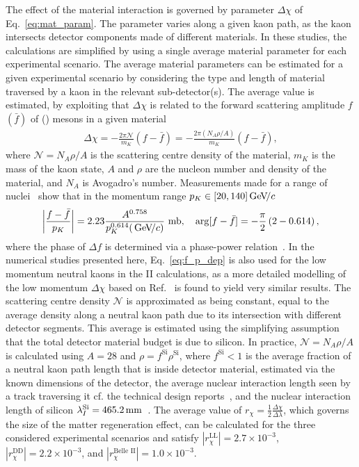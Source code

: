 The effect of the material interaction is governed by parameter $\Delta\chi$ of Eq.~\eqref{eq:mat_param}. The parameter varies along a given kaon path, as the kaon intersects detector components made of different materials. In these studies, the calculations are simplified by using a single average material parameter for each experimental scenario. The average material parameters can be estimated for a given experimental scenario by considering the type and length of material traversed by a kaon in the relevant sub-detector(s). The average value is estimated, by exploiting that $\Delta\chi$ is related to the forward scattering amplitude $f$ $(\bar f)$ of \Kz (\Kzb) mesons in a given material~\cite{goodRelationScatteringAbsorption1957,fetscherRegenerationArbitraryCoherent1996}
\begin{align}\label{eq:mat_delta_chi}
    \Delta \chi = - \frac{2\pi \mathcal{N}}{m_K}(f-\bar f) = - \frac{2\pi (N_A \rho/A)}{m_K}(f-\bar f),
\end{align}
where $\mathcal{N}=N_A\rho/A$ is the scattering centre density of the material, $m_K$ is the mass of the kaon state,  $A$ and $\rho$ are the nucleon number and density of the material, and $N_A$ is Avogadro's number.
Measurements made for a range of nuclei~\cite{Gsponer1979} show that in the momentum range $p_K\in [20, 140]\text{\,Ge\kern -0.1em V\!/}c$
\begin{align} \label{eq:f_p_dep}
    \left|\frac{f-\bar f}{p_K}\right| = 2.23 \frac{A^{0.758}} {p_K^{0.614} (\text{\,Ge\kern -0.1em V\!/}c)} \text{ mb}, \quad \arg [f - \bar f] = -\frac{\pi}{2}\left(2-0.614\right),
\end{align}
where the phase of $\Delta f$ is determined via a phase-power relation~\cite{Briere1995}. In the numerical studies presented here, Eq.~\eqref{eq:f_p_dep} is also used for the low momentum neutral kaons in the \belle II calculations, as a more detailed modelling of the low momentum $\Delta\chi$ based on Ref.~\cite{Ko2011} is found to yield very similar results. The scattering centre density $\mathcal{N}$ is approximated as being constant, equal to the average density along a neutral kaon path due to its intersection with different detector segments. This average is estimated using the simplifying assumption that the total detector material budget is due to silicon. In practice, $\mathcal{N}=N_A\rho/A$ is calculated using $A=28$ and $\rho = f^\text{Si}\rho^\text{Si}$, where $f^\text{Si}<1$ is the average fraction of a neutral kaon path length that is inside detector material, estimated via the known dimensions of the detector, the average nuclear interaction length seen by a track traversing it cf. the technical design reports~\cite{CERN-LHCC-2003-030,RICH-TDR}, and the nuclear interaction length of silicon $\lambda_I^\text{Si}=465.2\text{\,mm}$~\cite{PDG2020}. 
The average value of $r_\chi=\frac{1}{2}\frac{\Delta\chi}{\Delta\lambda}$, which governs the size of the matter regeneration effect, can be calculated for the three considered experimental scenarios and satisfy $|r_\chi^\text{LL}|=2.7\times10^{-3}$, $|r_\chi^\text{DD}|=2.2\times10^{-3}$, and ${|r_\chi^\text{Belle II}|=1.0\times10^{-3}}$. 


